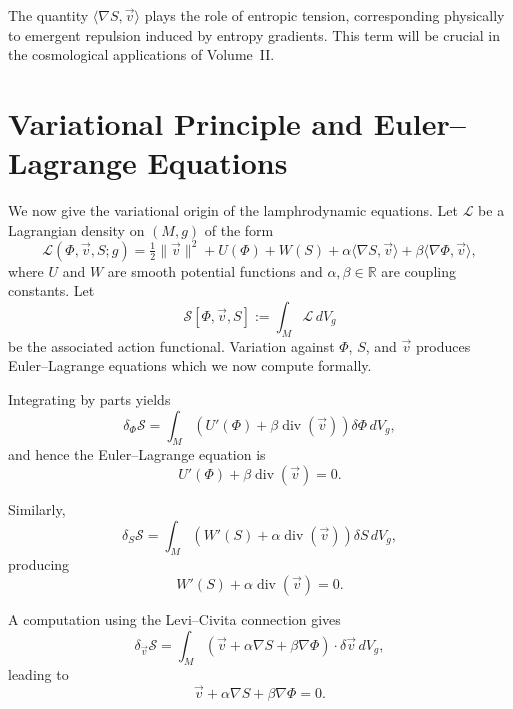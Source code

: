 \begin{remark}
The quantity $\langle\nabla S,\vec v\rangle$ plays the role of
entropic tension, corresponding physically to emergent repulsion
induced by entropy gradients. This term will be crucial in the
cosmological applications of Volume~II.
\end{remark}

\section{Variational Principle and Euler--Lagrange Equations}
\label{sec:variational}

We now give the variational origin of the lamphrodynamic equations.
Let $\mathcal{L}$ be a Lagrangian density on $(M,g)$ of the form
\begin{equation}
\label{eq:Lagrangian}
\mathcal{L}(\Phi,\vec v,S;g)
= \tfrac12\|\vec v\|^2
+ U(\Phi) + W(S) + \alpha\langle\nabla S,\vec v\rangle
+ \beta\langle\nabla\Phi,\vec v\rangle,
\end{equation}
where $U$ and $W$ are smooth potential functions and
$\alpha,\beta\in\mathbb{R}$ are coupling constants. Let
\[
\mathcal{S}[\Phi,\vec v,S]
:= \int_M \mathcal{L}\, dV_g
\]
be the associated action functional.
Variation against $\Phi$, $S$, and $\vec v$ produces
Euler--Lagrange equations which we now compute formally.

\vspace{0.5em}
Integrating by parts yields
\[
\delta_{\Phi}\mathcal{S}
= \int_M \left(
U'(\Phi) + \beta \operatorname{div}(\vec v)
\right)\delta\Phi\, dV_g,
\]
and hence the Euler--Lagrange equation is
\begin{equation}
\label{eq:EL-Phi}
U'(\Phi) + \beta\operatorname{div}(\vec v) = 0.
\end{equation}

\vspace{0.5em}
Similarly,
\[
\delta_{S}\mathcal{S}
= \int_M \left(
W'(S) + \alpha \operatorname{div}(\vec v)
\right)\delta S\, dV_g,
\]
producing
\begin{equation}
\label{eq:EL-S}
W'(S) + \alpha\operatorname{div}(\vec v)=0.
\end{equation}

\vspace{0.5em}
A computation using the Levi--Civita connection gives
\[
\delta_{\vec v}\mathcal{S}
= \int_M
\left(
\vec v + \alpha\nabla S + \beta\nabla\Phi
\right)\cdot \delta\vec v\, dV_g,
\]
leading to
\begin{equation}
\label{eq:EL-v}
\vec v + \alpha\nabla S + \beta\nabla\Phi = 0.
\end{equation}

